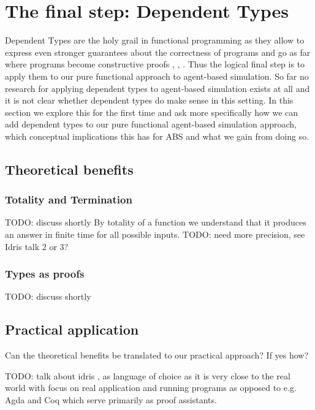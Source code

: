 \section{The final step: Dependent Types}
Dependent Types are the holy grail in functional programming as they allow to express even stronger guarantees about the correctness of programs and go as far where programs become constructive proofs \cite{altenkirch_why_2005}, \cite{altenkirch_pi_sigma:_2010}, \cite{program_homotopy_2013}. Thus the logical final step is to apply them to our pure functional approach to agent-based simulation.
So far no research for applying dependent types to agent-based simulation exists at all and it is not clear whether dependent types do make sense in this setting.
In this section we explore this for the first time and ask more specifically how we can add dependent types to our pure functional agent-based simulation approach, which conceptual implications this has for ABS and what we gain from doing so.

\subsection{Theoretical benefits}
\subsubsection{Totality and Termination}
TODO: discuss shortly
By totality of a function we understand that it produces an answer in finite time for all possible inputs. TODO: need more precision, see Idris talk 2 or 3?

\subsubsection{Types as proofs}
TODO: discuss shortly
\cite{wadler_propositions_2015}

\subsection{Practical application}
Can the theoretical benefits be translated to our practical approach? If yes how?

TODO: talk about idris \cite{brady_idris_2013}, \cite{brady_type-driven_2017} as language of choice as it is very close to the real world with focus on real application and running programs as opposed to e.g. Agda and Coq which serve primarily as proof assistants.

